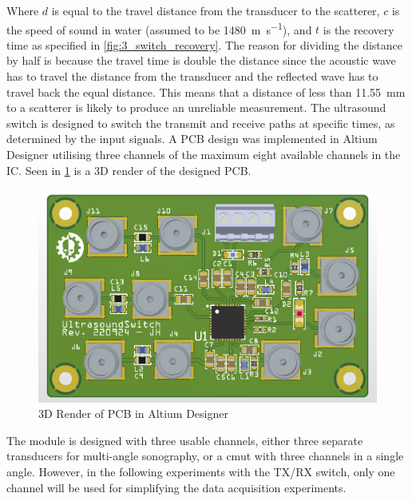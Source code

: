 Where $d$ is equal to the travel distance from the transducer to the scatterer, $c$ is the speed of sound in water (assumed to be \qty{1480}{\meter\per\second}), and $t$ is the recovery time as specified in  \cref{fig:3_switch_recovery}. The reason for dividing the distance by half is because the travel time is double the distance since the acoustic wave has to travel the distance from the transducer and the reflected wave has to travel back the equal distance. This means that a distance of less than \qty{11.55}{\milli\meter} to a scatterer is likely to produce an unreliable measurement. The ultrasound switch is designed to switch the transmit and receive paths at specific times, as determined by the input signals. A PCB design was implemented in Altium Designer \cite{altium} utilising three channels of the maximum eight available channels in the IC. Seen in \cref{fig:3_ultrasoundswitch} is a 3D render of the designed PCB.

\begin{figure}[htbp]
	\centering
	\includegraphics[width=.8\textwidth]{Figures/3_ultrasoundswitch.png}
	\caption{3D Render of PCB in Altium Designer}
	\label{fig:3_ultrasoundswitch}
\end{figure}
The module is designed with three usable channels, either three separate transducers for multi-angle sonography, or a \gls{cmut} with three channels in a single angle. However, in the following experiments with the TX/RX switch, only one channel will be used for simplifying the data acquisition experiments.

